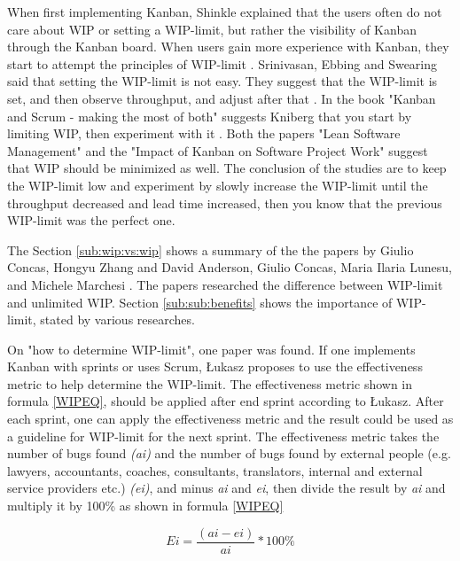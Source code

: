 \documentclass[UKenglish]{ifimaster}  %
\begin{document}
When first implementing Kanban, Shinkle explained that the users often do not care about WIP or setting a WIP-limit, but rather the visibility of Kanban through the Kanban board. When users gain more experience with Kanban, they start to attempt the principles of WIP-limit \parencite{Shinkle}. Srinivasan, Ebbing and Swearing said that setting the WIP-limit is not easy. They suggest that the WIP-limit is set, and then observe throughput, and adjust after that \parencite{Mandyam}. In the book "Kanban and Scrum - making the most of both" suggests Kniberg that you start by limiting WIP, then experiment with it \parencite{Kniberg}. Both the papers "Lean Software Management" \parencite{Kniberg} and the "Impact of Kanban on Software Project Work" \parencite{Ikonen} suggest that WIP should be minimized as well. The conclusion of the studies are to keep the WIP-limit low and experiment by slowly increase the WIP-limit until the throughput decreased and lead time increased, then you know that the previous WIP-limit was the perfect one.

The Section \ref{sub:wip:vs:wip} shows a summary of the the papers by Giulio Concas, Hongyu Zhang \parencite{SMR:SMR1599}  and David Anderson, Giulio Concas, Maria Ilaria Lunesu, and Michele Marchesi \parencite{DavidAnderson}. The papers researched the difference between WIP-limit and unlimited WIP. Section \ref{sub:sub:benefits} shows the importance of WIP-limit, stated by various researches. 

On "how to determine WIP-limit", one paper was found. If one implements Kanban with sprints or uses Scrum, \L ukasz proposes to use the effectiveness metric to help determine the WIP-limit. The effectiveness metric shown in formula \ref{WIPEQ}, should be applied after end sprint according to \L ukasz. After each sprint, one can apply the effectiveness metric and the result could be used as a guideline for WIP-limit for the next sprint. The effectiveness metric takes the number of bugs found \textit{(ai)} and the number of bugs found by external people (e.g. lawyers, accountants, coaches, consultants, translators, internal and external service providers etc.) \textit{(ei)}, and minus \textit{ai} and \textit{ei}, then divide the result by \textit{ai} and multiply it by 100\%  as shown in formula \ref{WIPEQ} \parencite{Sienkiewicz}

\begin{equation} \label{WIPEQ}
Ei=\frac{(ai-ei)}{ai}*100\%
\end{equation}
\end{document}
